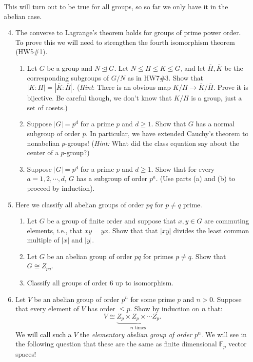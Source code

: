 \documentclass[11pt]{article}
\newcommand{\bF}{\mathbb{F}}
\begin{document}
    This will turn out to be true for all groups, so so far we only have it in the abelian case.
    \begin{enumerate}
    \setcounter{enumi}{3}
    \item The converse to Lagrange's theorem holds for groups of prime power order.  To prove this we will need to strengthen the fourth isomorphism theorem (HW5\#1).
  \begin{enumerate}
    \item Let $G$ be a group and $N\unlhd G$.  Let $N\le H\le K\le G$, and let $\overline H,\overline K$ be the corresponding subgroups of $G/N$ as in HW7\#3.  Show that $|K:H| = |\overline K:\overline H|$.  (\textit{Hint}: There is an obvious map $K/H\to\overline K/\overline H$.  Prove it is bijective.  Be careful though, we don't know that $K/H$ is a group, just a set of cosets.)
    \item Suppose $|G| = p^d$ for a prime $p$ and $d\ge 1$.  Show that $G$ has a normal subgroup of order $p$.  In particular, we have extended Cauchy's theorem to nonabelian $p$-groups!  (\textit{Hint:} What did the class equation say about the center of a $p$-group?)
    \item Suppose $|G| = p^d$ for a prime $p$ and $d\ge1$.  Show that for every $a = 1,2,\cdots,d$, $G$ has a subgroup of order $p^a$.  (Use parts (a) and (b) to proceed by induction).
  \end{enumerate}
  \item Here we classify all abelian groups of order $pq$ for $p\not=q$ prime.
  \begin{enumerate}
  \item Let $G$ be a group of finite order and suppose that $x,y\in G$ are commuting elements, i.e., that $xy = yx$.  Show that that $|xy|$ divides the least common multiple of $|x|$ and $|y|$.
  \item Let $G$ be an abelian group of order $pq$ for primes $p\not=q$.  Show that $G\cong Z_{pq}$.
  \item Classify all groups of order 6 up to isomorphism.
  \end{enumerate}
  \item Let $V$ be an abelian group of order $p^n$ for some prime $p$ and $n>0$.  Suppose that every element of $V$ has order $\le p$.  Show by induction on $n$ that:
  \[V\cong \underbrace{Z_p\times Z_p\times\cdots Z_p}_{n\text{ times}}.\]
  We will call such a $V$ the \textit{elementary abelian group of order $p^n$}.  We will see in the following question that these are the same as finite dimensional $\bF_p$ vector spaces!

\end{enumerate}
\end{document}

